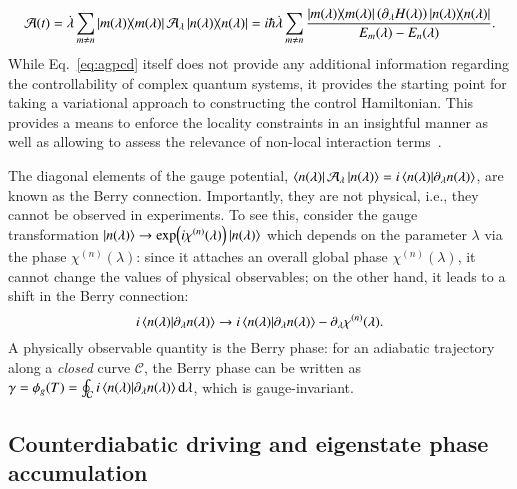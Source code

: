 \begin{equation}\label{eq:agpcd}
    \mathcal{A}(t) = \dot{\lambda} \sum_{m\neq n} \ketbra{m (\lambda)}\mathcal{A}_\lambda\ketbra{n(\lambda)} = i \hbar \dot{\lambda} \sum_{m\neq n} \frac{\ketbra{m (\lambda)} \left( \partial_\lambda H(\lambda) \right) \ketbra{n(\lambda)}}{E_m(\lambda)-E_n(\lambda)}. 
\end{equation}
While Eq.~\eqref{eq:agpcd} itself does not provide any additional information regarding the controllability of complex quantum systems, it provides the starting point for taking a variational approach to constructing the control Hamiltonian. This provides a means to enforce the locality constraints in an insightful manner as well as allowing to assess the relevance of non-local interaction terms~\cite{COLD_PRXQ}.


The diagonal elements of the gauge potential, $\bra{n(\lambda)}\mathcal{A}_\lambda\ket{n(\lambda)}=i\bra{n(\lambda)}\ket{\partial_\lambda n(\lambda)}$, are known as the Berry connection. Importantly, they are not physical, i.e., they cannot be observed in experiments. To see this, consider the gauge transformation $\ket{n(\lambda)}\to \exp(i\chi^{(n)}(\lambda))\ket{n(\lambda)}$ which depends on the parameter $\lambda$ via the phase $\chi^{(n)}(\lambda)$: since it attaches an overall global phase $\chi^{(n)}(\lambda)$, it cannot change the values of physical observables; on the other hand, it leads to a shift in the Berry connection: 
\begin{equation}
\label{eq:gauge_transf}
    i\bra{n(\lambda)}\ket{\partial_\lambda n(\lambda)} \to i\bra{n(\lambda)}\ket{\partial_\lambda n(\lambda)} - \partial_\lambda \chi^{(n)}(\lambda).
\end{equation}
A physically observable quantity is the Berry phase: for an adiabatic trajectory along a \textit{closed} curve $\mathcal{C}$, the Berry phase can be written as $\gamma = \phi_g(T) = \oint_\mathcal{C} i\bra{n(\lambda)}\ket{\partial_\lambda n(\lambda)} \mathrm d\lambda$, which is gauge-invariant.

\subsection{Counterdiabatic driving and eigenstate phase accumulation}
\label{sec:phases}

